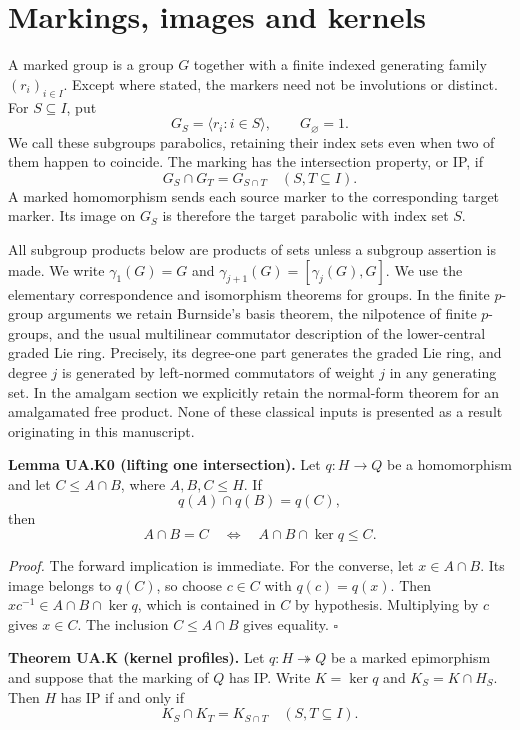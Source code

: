 \section{Markings, images and kernels}\label{markings-images-and-kernels}

A marked group is a group \(G\) together with a finite indexed
generating family \((r_i)_{i\in I}\). Except where stated, the markers
need not be involutions or distinct. For \(S\subseteq I\), put \[
G_S=\langle r_i:i\in S\rangle,\qquad G_\varnothing=1.
\] We call these subgroups parabolics, retaining their index sets even
when two of them happen to coincide. The marking has the intersection
property, or IP, if \[
G_S\cap G_T=G_{S\cap T}\quad(S,T\subseteq I).
\tag{M1}
\] A marked homomorphism sends each source marker to the corresponding
target marker. Its image on \(G_S\) is therefore the target parabolic
with index set \(S\).

All subgroup products below are products of sets unless a subgroup
assertion is made. We write \(\gamma_1(G)=G\) and
\(\gamma_{j+1}(G)=[\gamma_j(G),G]\). We use the elementary
correspondence and isomorphism theorems for groups. In the finite
\(p\)-group arguments we retain Burnside's basis theorem, the nilpotence
of finite \(p\)-groups, and the usual multilinear commutator description
of the lower-central graded Lie ring. Precisely, its degree-one part
generates the graded Lie ring, and degree \(j\) is generated by
left-normed commutators of weight \(j\) in any generating set. In
the amalgam section we explicitly retain the normal-form theorem for an
amalgamated free product. None of these classical inputs is presented as
a result originating in this manuscript.

\textbf{Lemma UA.K0 (lifting one intersection).} Let \(q:H\to Q\) be a
homomorphism and let \(C\leq A\cap B\), where \(A,B,C\leq H\). If \[
q(A)\cap q(B)=q(C),
\] then \[
A\cap B=C\quad\Longleftrightarrow\quad A\cap B\cap\ker q\leq C.
\tag{M2}
\]

\emph{Proof.} The forward implication is immediate. For the converse,
let \(x\in A\cap B\). Its image belongs to \(q(C)\), so choose
\(c\in C\) with \(q(c)=q(x)\). Then \(xc^{-1}\in A\cap B\cap\ker q\),
which is contained in \(C\) by hypothesis. Multiplying by \(c\) gives
\(x\in C\). The inclusion \(C\leq A\cap B\) gives equality. \(\square\)

\textbf{Theorem UA.K (kernel profiles).} Let \(q:H\twoheadrightarrow Q\)
be a marked epimorphism and suppose that the marking of \(Q\) has IP.
Write \(K=\ker q\) and \(K_S=K\cap H_S\). Then \(H\) has IP if and only
if \[
K_S\cap K_T=K_{S\cap T}\quad(S,T\subseteq I).
\tag{M3}
\]

